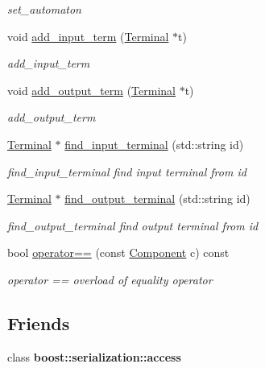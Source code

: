 \begin{DoxyCompactItemize}
\begin{DoxyCompactList}\small\item\em set\+\_\+automaton \end{DoxyCompactList}\item 
void \hyperlink{class_component_ae16ece39192fc71a468e74b7ee3c340b}{add\+\_\+input\+\_\+term} (\hyperlink{class_terminal}{Terminal} $\ast$t)
\begin{DoxyCompactList}\small\item\em add\+\_\+input\+\_\+term \end{DoxyCompactList}\item 
void \hyperlink{class_component_ad3d6d9f87552e06409bb759b26743a9d}{add\+\_\+output\+\_\+term} (\hyperlink{class_terminal}{Terminal} $\ast$t)
\begin{DoxyCompactList}\small\item\em add\+\_\+output\+\_\+term \end{DoxyCompactList}\item 
\hyperlink{class_terminal}{Terminal} $\ast$ \hyperlink{class_component_ab62c61e09476eea98a5ffd48acdbd11a}{find\+\_\+input\+\_\+terminal} (std\+::string id)
\begin{DoxyCompactList}\small\item\em find\+\_\+input\+\_\+terminal find input terminal from id \end{DoxyCompactList}\item 
\hyperlink{class_terminal}{Terminal} $\ast$ \hyperlink{class_component_ac4e822092e193ccf5c2416dcaf2a4982}{find\+\_\+output\+\_\+terminal} (std\+::string id)
\begin{DoxyCompactList}\small\item\em find\+\_\+output\+\_\+terminal find output terminal from id \end{DoxyCompactList}\item 
bool \hyperlink{class_component_a4ad3ccb5711e8d27c3488b6d353e6426}{operator==} (const \hyperlink{class_component}{Component} c) const 
\begin{DoxyCompactList}\small\item\em operator == overload of equality operator \end{DoxyCompactList}\end{DoxyCompactItemize}
\subsection*{Friends}
\begin{DoxyCompactItemize}
\item 
class {\bfseries boost\+::serialization\+::access}\hypertarget{class_component_ac98d07dd8f7b70e16ccb9a01abf56b9c}{}\label{class_component_ac98d07dd8f7b70e16ccb9a01abf56b9c}

\end{DoxyCompactItemize}

